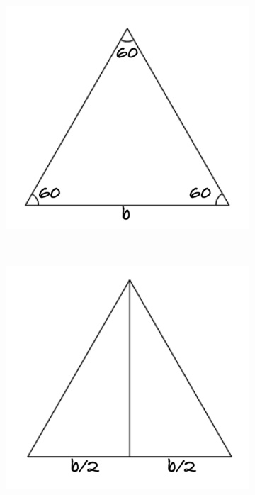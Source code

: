 \documentclass[12pt,letter]{article}
\begin{document}
\begin{figure}[h]
	\caption{Area of Equilateral Triangle Constructions}
	\centering
	\begin{subfigure}[h]{0.24\textwidth}
		\includegraphics[width=\textwidth]{equil_tri_a.pdf}
		\caption{}
		\label{fig:equil_tri_a}
	\end{subfigure}
	~
	\begin{subfigure}[h]{0.24\textwidth}
		\includegraphics[width=\textwidth]{equil_tri_b.pdf}

\end{subfigure}
\end{figure}
\end{document}
